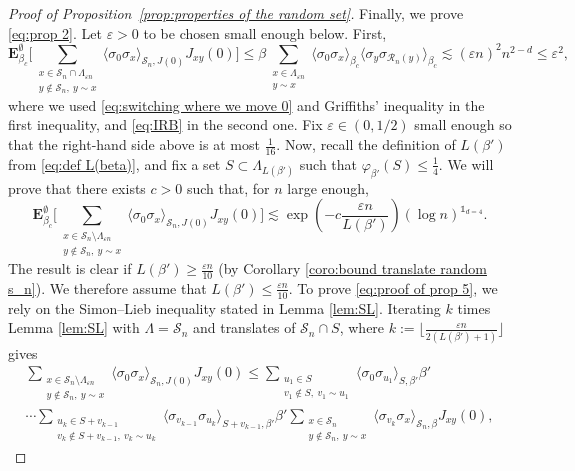 \documentclass[10pt,a4paper]{amsart}
\numberwithin{equation}{section}
\begin{document}
\begin{proof}[Proof of Proposition~\textup{\ref{prop:properties of the random set}}]
	Finally, we prove \eqref{eq:prop 2}. Let $\varepsilon>0$ to be chosen small enough below. First, 
	\begin{equation}\label{eq:proof of prop 4}
		\mathbf E_{\beta_c}^\emptyset\Big[\sum_{\substack{x\in \mathcal S_n\cap \Lambda_{\varepsilon n}\\y\notin \mathcal S_n, \: y\sim x}}\langle \sigma_0\sigma_x\rangle_{\mathcal S_n,J(0)}J_{xy}(0)\Big]\leq  \beta\sum_{\substack{x\in \Lambda_{\varepsilon n}\\y\sim x}}\langle \sigma_0\sigma_x\rangle_{\beta_c}\langle \sigma_y\sigma_{\mathcal R_n(y)}\rangle_{\beta_c}\lesssim (\varepsilon n)^2 n^{2-d}\leq \varepsilon^2 ,
	\end{equation}
		where we used \eqref{eq:switching where we move 0} and Griffiths' inequality in the first inequality, and \eqref{eq:IRB} in the second one. Fix $\varepsilon\in (0,1/2)$ small enough so that the right-hand side above is at most $\tfrac{1}{16}$. Now, recall the definition of $L(\beta')$ from \eqref{eq:def L(beta)}, and fix a set $S\subset \Lambda_{L(\beta')}$ such that $\varphi_{\beta'}(S)\leq \frac{1}{4}$. We will prove that there exists $c>0$ such that, for $n$ large enough, 
	\begin{equation}\label{eq:proof of prop 5}
		\mathbf E_{\beta_c}^\emptyset\Big[\sum_{\substack{x\in \mathcal S_n\setminus\Lambda_{\varepsilon n}\\y\notin \mathcal S_n, \: y\sim x}}\langle \sigma_0\sigma_x\rangle_{\mathcal S_n,J(0)}J_{xy}(0)\Big]\lesssim \exp\left(-c\frac{\varepsilon n}{L(\beta')}\right)(\log n)^{\mathds{1}_{d=4}}.
	\end{equation}
		The result is clear if $L(\beta')\geq \tfrac{\varepsilon n}{10}$ (by Corollary \ref{coro:bound translate random s_n}). We therefore assume that $L(\beta')\leq \tfrac{\varepsilon n}{10}$. To prove \eqref{eq:proof of prop 5}, we rely on the Simon--Lieb inequality stated in Lemma \ref{lem:SL}. Iterating $k$ times Lemma \ref{lem:SL} with $\Lambda=\mathcal S_n$ and translates of $\mathcal S_n\cap S$, where $k:=\lfloor\tfrac{\varepsilon n}{2(L(\beta')+1)} \rfloor$ gives
	\begin{multline}
		\sum_{\substack{x\in \mathcal S_n\setminus\Lambda_{\varepsilon n}\\y\notin \mathcal S_n, \: y\sim x}}\langle \sigma_0\sigma_x\rangle_{\mathcal S_n,J(0)}J_{xy}(0)\leq \sum_{\substack{u_1\in S\\v_1\notin S, \: v_1\sim u_1}}\langle \sigma_0\sigma_{u_1}\rangle_{S,\beta'} \beta' \\\cdots \sum_{\substack{u_k\in S+v_{k-1}\\v_k\notin S+v_{k-1},\: v_k\sim u_k}}\langle \sigma_{v_{k-1}}\sigma_{u_k}\rangle_{S+v_{k-1},\beta'}\beta' \sum_{\substack{x\in \mathcal S_n\\y\notin \mathcal S_n, \: y\sim x}}\langle \sigma_{v_k}\sigma_x\rangle_{\mathcal S_n,\beta}J_{xy}(0),

\end{multline}
\end{proof}
\end{document}
